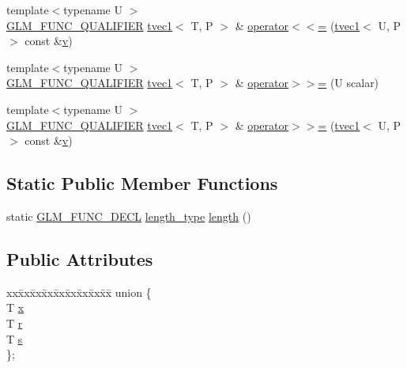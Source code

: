 \begin{DoxyCompactItemize}
\item 
{\footnotesize template$<$typename U $>$ }\\\mbox{\hyperlink{setup_8hpp_a33fdea6f91c5f834105f7415e2a64407}{G\+L\+M\+\_\+\+F\+U\+N\+C\+\_\+\+Q\+U\+A\+L\+I\+F\+I\+ER}} \mbox{\hyperlink{structglm_1_1tvec1}{tvec1}}$<$ T, P $>$ \& \mbox{\hyperlink{structglm_1_1tvec1_a758704df3a9b6ecab58bcfa9baf7582b}{operator$<$$<$=}} (\mbox{\hyperlink{structglm_1_1tvec1}{tvec1}}$<$ U, P $>$ const \&\mbox{\hyperlink{glad_8h_a14cfbe2fc2234f5504618905b69d1e06}{v}})
\item 
{\footnotesize template$<$typename U $>$ }\\\mbox{\hyperlink{setup_8hpp_a33fdea6f91c5f834105f7415e2a64407}{G\+L\+M\+\_\+\+F\+U\+N\+C\+\_\+\+Q\+U\+A\+L\+I\+F\+I\+ER}} \mbox{\hyperlink{structglm_1_1tvec1}{tvec1}}$<$ T, P $>$ \& \mbox{\hyperlink{structglm_1_1tvec1_a664c0b0509ecb502caee8e9f20edc287}{operator$>$$>$=}} (U scalar)
\item 
{\footnotesize template$<$typename U $>$ }\\\mbox{\hyperlink{setup_8hpp_a33fdea6f91c5f834105f7415e2a64407}{G\+L\+M\+\_\+\+F\+U\+N\+C\+\_\+\+Q\+U\+A\+L\+I\+F\+I\+ER}} \mbox{\hyperlink{structglm_1_1tvec1}{tvec1}}$<$ T, P $>$ \& \mbox{\hyperlink{structglm_1_1tvec1_a7412ce02e214e4f036ce87a8f7a3f32e}{operator$>$$>$=}} (\mbox{\hyperlink{structglm_1_1tvec1}{tvec1}}$<$ U, P $>$ const \&\mbox{\hyperlink{glad_8h_a14cfbe2fc2234f5504618905b69d1e06}{v}})
\end{DoxyCompactItemize}
\subsection*{Static Public Member Functions}
\begin{DoxyCompactItemize}
\item 
static \mbox{\hyperlink{setup_8hpp_ab2d052de21a70539923e9bcbf6e83a51}{G\+L\+M\+\_\+\+F\+U\+N\+C\+\_\+\+D\+E\+CL}} \mbox{\hyperlink{structglm_1_1tvec1_ae6254cf662020a8328b744b40f419527}{length\+\_\+type}} \mbox{\hyperlink{structglm_1_1tvec1_aa25cb652c92eb83b9ef027d82365bb01}{length}} ()
\end{DoxyCompactItemize}
\subsection*{Public Attributes}
\begin{DoxyCompactItemize}
\item 
\begin{tabbing}
xx\=xx\=xx\=xx\=xx\=xx\=xx\=xx\=xx\=\kill
union \{\\
\>T \mbox{\hyperlink{structglm_1_1tvec1_ad7a6121d82ab7692cbc8798aecdf07ee}{x}}\\
\>T \mbox{\hyperlink{structglm_1_1tvec1_a7f3893144bf66ec97a3e0a45cceac7b6}{r}}\\
\>T \mbox{\hyperlink{structglm_1_1tvec1_a0b19a3746dcf46d86ed4953d4b8307e5}{s}}\\
\}; \\

\end{tabbing}\end{DoxyCompactItemize}


